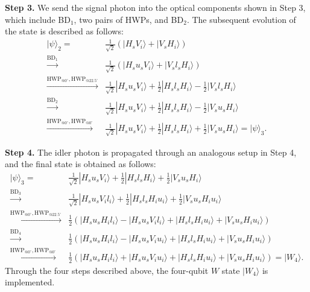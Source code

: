\documentclass[prl,aps,notitlepage,superscriptaddress,showpacs,nofootinbib]{revtex4-2}
\begin{document}
\textbf{Step 3.} We send the signal photon into the optical components shown in Step 3, which include BD$_1$, two pairs of HWPs, and BD$_2$. The subsequent evolution of the state is described as follows:
\begin{equation}
	\begin{aligned}
		|\psi\rangle_2=&\frac{1}{\sqrt{2}}(|H_sV_i\rangle+|V_sH_i\rangle)\\
		\xrightarrow{\text{BD$_1$}} &\frac{1}{\sqrt{2}}(|H_su_sV_i\rangle+|V_sl_sH_i\rangle)\\
		\xrightarrow{\text{HWP}_{@0^\circ},\text{HWP}_{@22.5^\circ}} &\frac{1}{\sqrt{2}}|H_su_sV_i\rangle+\frac{1}{2}|H_sl_sH_i\rangle-\frac{1}{2}|V_sl_sH_i\rangle\\
		\xrightarrow{\text{BD$_2$}} &\frac{1}{\sqrt{2}}|H_su_sV_i\rangle+\frac{1}{2}|H_sl_sH_i\rangle-\frac{1}{2}|V_su_sH_i\rangle\\
		\xrightarrow{\text{HWP}_{@0^\circ},\text{HWP}_{@0^\circ}} &\frac{1}{\sqrt{2}}|H_su_sV_i\rangle+\frac{1}{2}|H_sl_sH_i\rangle+\frac{1}{2}|V_su_sH_i\rangle=|\psi\rangle_3.
	\end{aligned}
\end{equation}

\textbf{Step 4.} The idler photon is propagated through an analogous setup in Step 4, and the final state is obtained as follows:
\begin{equation}
	\begin{aligned}
		|\psi\rangle_3=&\frac{1}{\sqrt{2}}|H_su_sV_i\rangle+\frac{1}{2}|H_sl_sH_i\rangle+\frac{1}{2}|V_su_sH_i\rangle\\
		\xrightarrow{\text{BD$_3$}} &\frac{1}{\sqrt{2}}|H_su_sV_il_i\rangle+\frac{1}{2}|H_sl_sH_iu_i\rangle+\frac{1}{2}|V_su_sH_iu_i\rangle\\
		\xrightarrow{\text{HWP}_{@0^\circ},\text{HWP}_{@22.5^\circ}}
		&\frac{1}{2}(|H_su_sH_il_i\rangle-|H_su_sV_il_i\rangle+|H_sl_sH_iu_i\rangle+|V_su_sH_iu_i\rangle)\\
		\xrightarrow{\text{BD$_4$}} &\frac{1}{2}(|H_su_sH_il_i\rangle-|H_su_sV_iu_i\rangle+|H_sl_sH_iu_i\rangle+|V_su_sH_iu_i\rangle)\\
		\xrightarrow{\text{HWP}_{@0^\circ},\text{HWP}_{@0^\circ}}
		&\frac{1}{2}(|H_su_sH_il_i\rangle+|H_su_sV_iu_i\rangle+|H_sl_sH_iu_i\rangle+|V_su_sH_iu_i\rangle)=|W_4\rangle.
	\end{aligned}
\end{equation}
Through the four steps described above, the four-qubit $W$ state $|W_4\rangle$ is implemented.
\end{document}
